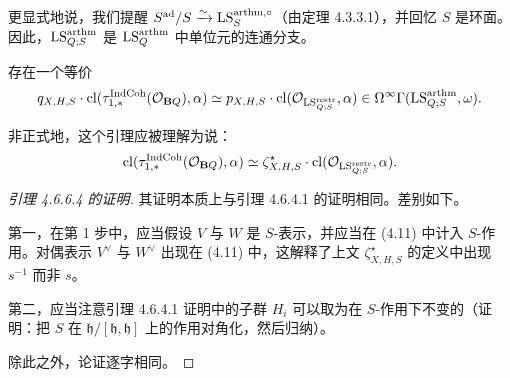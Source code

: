 \begin{remark}
更显式地说，我们提醒 $S^{\operatorname{ad}}/S\xrightarrow{\sim}\mathrm{LS}^{\mathrm{arthm},\circ}_{S}$（由定理 4.3.3.1），并回忆 $S$ 是环面。因此，$\mathrm{LS}^{\mathrm{arthm}}_{Q;S}$ 是 $\mathrm{LS}^{\mathrm{arthm}}_{Q}$ 中单位元的连通分支。
\end{remark}

\begin{lem}
存在一个等价
\[
  q_{X,H,S}\cdot\operatorname{cl}(\tau^{\mathrm{IndCoh}}_{1,*}(\mathcal{O}_{\mathbf{B}Q}),\alpha)
  \simeq p_{X,H,S}\cdot\operatorname{cl}(\mathcal{O}_{\mathrm{LS}^{\mathrm{restr}}_{Q;S}},\alpha)
  \in\Omega^\infty\Gamma(\mathrm{LS}^{\mathrm{arthm}}_{Q;S},\omega).
\]
\end{lem}

\begin{remark}
非正式地，这个引理应被理解为说：
\[
  \operatorname{cl}(\tau^{\mathrm{IndCoh}}_{1,*}(\mathcal{O}_{\mathbf{B}Q}),\alpha)
  \simeq\zeta^{\star}_{X,H,S}\cdot\operatorname{cl}(\mathcal{O}_{\mathrm{LS}^{\mathrm{restr}}_{Q;S}},\alpha).
\]
\end{remark}

\begin{proof}[引理 4.6.6.4 的证明]
其证明本质上与引理 4.6.4.1 的证明相同。差别如下。

第一，在第 1 步中，应当假设 $V$ 与 $W$ 是 $S$-表示，并应当在 (4.11) 中计入 $S$-作用。对偶表示 $V^{\vee}$ 与 $W^{\vee}$ 出现在 (4.11) 中，这解释了上文 $\zeta^{\star}_{X,H,S}$ 的定义中出现 $s^{-1}$ 而非 $s$。

第二，应当注意引理 4.6.4.1 证明中的子群 $H_i$ 可以取为在 $S$-作用下不变的（证明：把 $S$ 在 $\mathfrak{h}/[\mathfrak{h},\mathfrak{h}]$ 上的作用对角化，然后归纳）。

除此之外，论证逐字相同。
\end{proof}
